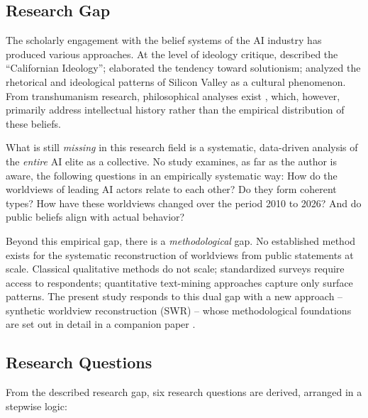 \documentclass[12pt,a4paper]{article}
\begin{document}
\subsection{Research Gap}
\label{sec:einleitung:luecke}

The scholarly engagement with the belief systems of the AI industry has produced various approaches. At the level of ideology critique, \citet{BarbCam1996} described the ``Californian Ideology''; \citet{Morozov2013} elaborated the tendency toward solutionism; \citet{Daub2020} analyzed the rhetorical and ideological patterns of Silicon Valley as a cultural phenomenon. From transhumanism research, philosophical analyses exist \citep{Bostrom2005, MoreVitaMore2013, Coeckelbergh2020}, which, however, primarily address intellectual history rather than the empirical distribution of these beliefs.

What is still \emph{missing} in this research field is a systematic, data-driven analysis of the \emph{entire} AI elite as a collective. No study examines, as far as the author is aware, the following questions in an empirically systematic way: How do the worldviews of leading AI actors relate to each other? Do they form coherent types? How have these worldviews changed over the period 2010 to 2026? And do public beliefs align with actual behavior?

Beyond this empirical gap, there is a \emph{methodological} gap. No established method exists for the systematic reconstruction of worldviews from public statements at scale. Classical qualitative methods do not scale; standardized surveys require access to respondents; quantitative text-mining approaches capture only surface patterns. The present study responds to this dual gap with a new approach -- synthetic worldview reconstruction (SWR) -- whose methodological foundations are set out in detail in a companion paper \citep{Geiger2026SWR}.


\subsection{Research Questions}
\label{sec:einleitung:fragen}

From the described research gap, six research questions are derived, arranged in a stepwise logic:
\end{document}
